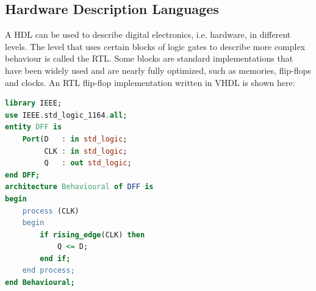 \documentclass[11pt,british]{article}
\begin{document}
%

\subsection{Hardware Description Languages}
\label{subsec:HDL}

A \gls{HDL} can be used to describe digital electronics, i.e. hardware, in different levels. The level that uses certain blocks of logic gates to describe more complex behaviour is called the \gls{RTL}. Some blocks are standard implementations that have been widely used and are nearly fully optimized, such as memories, flip-flops and clocks. An \gls{RTL} flip-flop implementation written in \gls{VHDL} is shown here: 
\begin{lstlisting}[language=VHDL, tabsize=4, frame=single, framesep=2mm, belowskip=16pt, aboveskip=16pt, showstringspaces=false]
library IEEE;
use IEEE.std_logic_1164.all;
entity DFF is
	Port(D 	 : in std_logic;
		 CLK : in std_logic;
		 Q 	 : out std_logic;
end DFF;
architecture Behavioural of DFF is
begin
	process (CLK)
	begin
		if rising_edge(CLK) then
			Q <= D;
		end if;
	end process;
end Behavioural;
\end{lstlisting}
\end{document}
